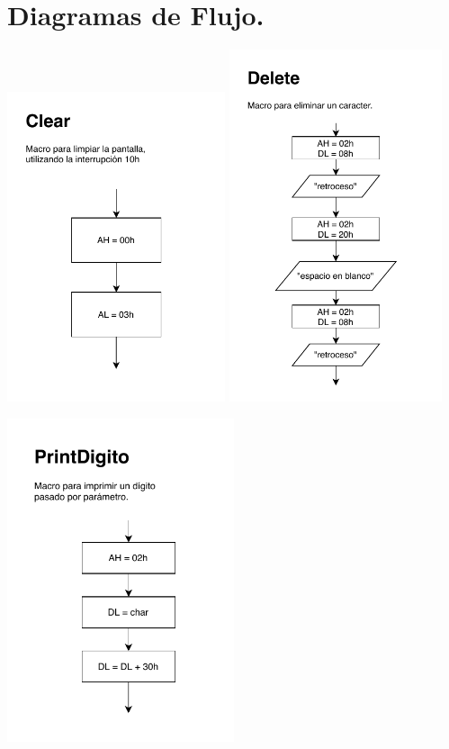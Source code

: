 \documentclass[letter,12 pt,titlepage]{article}
\begin{document}
    \section{Diagramas de Flujo.}
    \includegraphics[width=0.48\textwidth]{img/diagramas/p01-Clear}
    \includegraphics[width=0.47\textwidth]{img/diagramas/p01-Delete}

    \includegraphics[width=0.5\textwidth]{img/diagramas/p01-PrintDigito}
    
    
    
\end{document}
